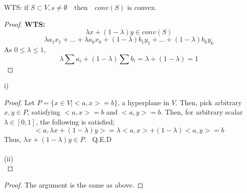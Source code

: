\documentclass[12pt]{article}
\newenvironment{problem}[2][Problem]{\begin{trivlist}
\item[\hskip \labelsep {\bfseries #1}\hskip \labelsep {\bfseries #2.}]}{\end{trivlist}}
\begin{document}
\begin{problem}{7.1}
\textbf{WTS:} if $ S \subset V, s \neq \emptyset \quad \text{then} \quad conv(S)$ is convex.
\end{problem}
\begin{proof}
\textbf{WTS:} $$\lambda x + (1 - \lambda)y \in conv(S)$$
$$ \lambda a_1x_1 + \hdots + \lambda a_kx_k + (1-\lambda)b_1y_1 + \hdots + (1-\lambda)b_ky_k
$$
As $0 \leq \lambda \leq 1$,
$$ \lambda \sum a_i + (1-\lambda)\sum b_i  = \lambda + (1-\lambda) = 1
$$
\end{proof}
\begin{problem}{7.2}
(i) \\
\begin{proof} Let $ P = \{ x \in V | <a,x> = b\}$, a hyperplane in $V$. Then, pick arbitrary $x,y \in P $, satisfying $<a,x> = b$ and $<a,y> = b$. Then, for arbitrary scalar $\lambda \in [0,1]$, the following is satisfied;
\[<a,\lambda x + (1-\lambda) y > = \lambda <a,x> + (1-\lambda) <a,y> = b \]
Thus, $\lambda x + (1-\lambda)y \in P$. \ Q.E.D \\\\
(ii)\\
\end{proof}
\end{problem}
\begin{proof}
The argument is the same as above. \end{proof}
\end{document}
